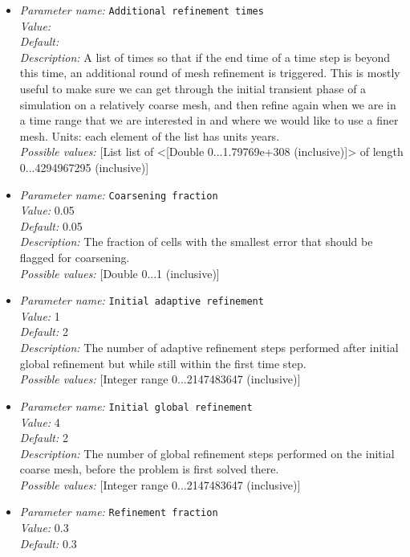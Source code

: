 \begin{itemize}
\item {\it Parameter name:} {\tt Additional refinement times}\\
{\it Value:} \\
{\it Default:} \\
{\it Description:} A list of times so that if the end time of a time step is beyond this time, an additional round of mesh refinement is triggered. This is mostly useful to make sure we can get through the initial transient phase of a simulation on a relatively coarse mesh, and then refine again when we are in a time range that we are interested in and where we would like to use a finer mesh. Units: each element of the list has units years.\\
{\it Possible values:} [List list of <[Double 0...1.79769e+308 (inclusive)]> of length 0...4294967295 (inclusive)]
\item {\it Parameter name:} {\tt Coarsening fraction}\\
{\it Value:} 0.05\\
{\it Default:} 0.05\\
{\it Description:} The fraction of cells with the smallest error that should be flagged for coarsening.\\
{\it Possible values:} [Double 0...1 (inclusive)]
\item {\it Parameter name:} {\tt Initial adaptive refinement}\\
{\it Value:} 1\\
{\it Default:} 2\\
{\it Description:} The number of adaptive refinement steps performed after initial global refinement but while still within the first time step.\\
{\it Possible values:} [Integer range 0...2147483647 (inclusive)]
\item {\it Parameter name:} {\tt Initial global refinement}\\
{\it Value:} 4\\
{\it Default:} 2\\
{\it Description:} The number of global refinement steps performed on the initial coarse mesh, before the problem is first solved there.\\
{\it Possible values:} [Integer range 0...2147483647 (inclusive)]
\item {\it Parameter name:} {\tt Refinement fraction}\\
{\it Value:} 0.3\\
{\it Default:} 0.3\\

\end{itemize}
